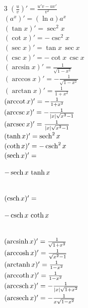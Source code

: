 \def\sinh{\mathop{\rm sinh}\nolimits}
\def\cosh{\mathop{\rm cosh}\nolimits}
\def\sech{\mathop{\rm sech}\nolimits}
\def\csch{\mathop{\rm csch}\nolimits}
\def\coth{\mathop{\rm coth}\nolimits}
\def\tanh{\mathop{\rm tanh}\nolimits}

\def\arccot{\mathop{\rm arccot}\nolimits}
\def\arcsec{\mathop{\rm arcsec}\nolimits}
\def\arccsc{\mathop{\rm arccsc}\nolimits}
\def\arcsinh{\mathop{\rm arcsinh}\nolimits}
\def\arccosh{\mathop{\rm arccosh}\nolimits}
\def\arctanh{\mathop{\rm arctanh}\nolimits}
\def\arccoth{\mathop{\rm arccoth}\nolimits}
\def\arcsech{\mathop{\rm arcsech}\nolimits}
\def\arccsch{\mathop{\rm arccsch}\nolimits}
\begin{scriptsize}
\begin{multicols}{3}
	$ \left(\frac{u}{v}\right)' = \frac{u'v - uv'}{v^2} $ \\
	$ (a^x)' = (\ln a) a^x $ \\
	$ (\tan x)' = \sec^2 x $ \\
	$ (\cot x)' = -\csc^2 x $ \\
	$ (\sec x)' = \tan x\, \sec x $ \\
	$ (\csc x)' = - \cot x\, \csc x $ \\
	$ (\arcsin x)' = \frac{1}{\sqrt{1-x^2}} $ \\
	$ (\arccos x)' = -\frac{1}{\sqrt{1-x^2}} $ \\
	$ (\arctan x)' = \frac{1}{1+x^2} $ \\
	$ (\arccot x)' = -\frac{1}{1+x^2} $ \\
	$ (\arccsc x)' = -\frac{1}{\vert x \vert \sqrt{x^2-1}} $ \\
	$ (\arcsec x)' = \frac{1}{\vert x \vert \sqrt{x^2-1}} $ \\
	$ (\tanh x)' = \sech^2 x $ \\
	$ (\coth x)' = -\csch^2 x $ \\
	$ (\sech x)' =$ \begin{tiny}$-\sech x \, \tanh x$\end{tiny} \\
	$ (\csch x)' =$ \begin{tiny}$-\csch x \, \coth x$\end{tiny} \\
	$ (\arcsinh x)' = \frac{1}{\sqrt{1+x^2}} $ \\
	$ (\arccosh x)' = \frac{1}{\sqrt{x^2-1}} $ \\
	$ (\arctanh x)' = \frac{1}{1-x^2} $ \\
	$ (\arccoth x)' = \frac{1}{1-x^2} $ \\
	$ (\arccsch x)' = -\frac{1}{\vert x \vert \sqrt{1+x^2}} $ \\
	$ (\arcsech x)' = -\frac{1}{x \sqrt{1-x^2}} $ \\
\end{multicols}
\end{scriptsize}
